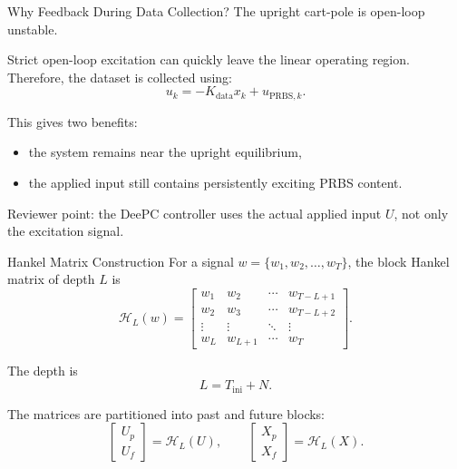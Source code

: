 \documentclass[aspectratio=169,11pt]{beamer}
\newcommand{\Tini}{T_{\mathrm{ini}}}
\newcommand{\Npred}{N}
\begin{document}
\begin{frame}{Why Feedback During Data Collection?}
    The upright cart-pole is open-loop unstable.

    \vspace{0.3cm}
    Strict open-loop excitation can quickly leave the linear operating region. Therefore, the dataset is collected using:
    \[
    u_k = -K_{\mathrm{data}}x_k + u_{\mathrm{PRBS},k}.
    \]

    \vspace{0.3cm}
    This gives two benefits:
    \begin{itemize}
        \item the system remains near the upright equilibrium,
        \item the applied input still contains persistently exciting PRBS content.
    \end{itemize}

    \vspace{0.3cm}
    Reviewer point: the DeePC controller uses the actual applied input $U$, not only the excitation signal.
\end{frame}

\begin{frame}{Hankel Matrix Construction}
    For a signal $w=\{w_1,w_2,\ldots,w_T\}$, the block Hankel matrix of depth $L$ is
    \[
    \mathcal{H}_L(w)=
    \begin{bmatrix}
    w_1 & w_2 & \cdots & w_{T-L+1}\\
    w_2 & w_3 & \cdots & w_{T-L+2}\\
    \vdots & \vdots & \ddots & \vdots\\
    w_L & w_{L+1} & \cdots & w_T
    \end{bmatrix}.
    \]

    \vspace{0.3cm}
    The depth is
    \[
    L=\Tini+\Npred.
    \]

    \vspace{0.3cm}
    The matrices are partitioned into past and future blocks:
    \[
    \begin{bmatrix}
    U_p\\U_f
    \end{bmatrix}
    =
    \mathcal{H}_L(U),
    \qquad
    \begin{bmatrix}
    X_p\\X_f
    \end{bmatrix}
    =
    \mathcal{H}_L(X).
    \]
\end{frame}
\end{document}
